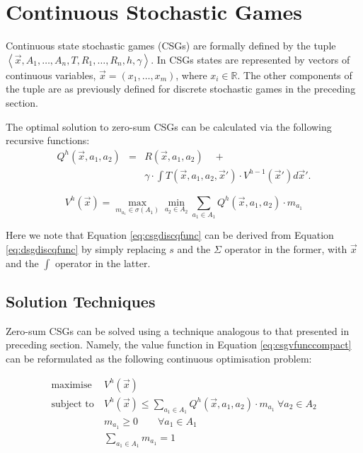 \section{Continuous Stochastic Games}
\label{sec:csg}

Continuous state stochastic games (CSGs) are formally defined by the tuple
$ \left\langle \vec{x}, A_{1}, \ldots, A_{n}, T, R_{1}, \ldots, R_{n}, h, \gamma  \right\rangle$.
In CSGs states are represented by vectors of continuous variables, $\vec{x} = \left(x_1, \ldots, x_m \right)$, 
where $x_i \in \mathbb{R}$. The other components of the tuple are as 
previously defined for discrete stochastic games in the preceding section.

The optimal solution to zero-sum CSGs can be calculated via the 
following recursive functions:
{\small 
\begin{eqnarray}
\label{eq:csgdiscqfunc}
  Q^{h}(\vec{x}, a_1, a_2) &=& R(\vec{x}, a_1, a_2) \quad + \nonumber \\
  && \gamma \cdot \int T(\vec{x}, a_1, a_2, \vec{x}') \cdot V^{h-1}(\vec{x}') d\vec{x}' .
\end{eqnarray}
}%

{\small 
\begin{equation}
\label{eq:csgvfunccompact}
  V^{h}(\vec{x}) = \max_{m_{a_{1}} \in \sigma(A_1)} \min_{a_2 \in A_2} \sum_{a_1 \in A_1} Q^{h}(\vec{x}, a_1, a_2) \cdot m_{a_{1}}
\end{equation}
}%

Here we note that Equation \eqref{eq:csgdiscqfunc} can be derived from Equation \eqref{eq:dsgdiscqfunc}
by simply replacing $s$ and the $\Sigma$ operator in the former, with $\vec{x}$
and the $\int$ operator in the latter.

\subsection{Solution Techniques}

Zero-sum CSGs can be solved using a technique analogous to that 
presented in preceding section. Namely, the value function in Equation
\eqref{eq:csgvfunccompact} can be reformulated as the following continuous 
optimisation problem:

{\small 
\begin{subequations}
\begin{align}
\text{maximise} &\   V^{h}(\vec{x}) \nonumber \\
\text{subject to} &\   V^{h}(\vec{x}) \leq \sum_{a_1 \in A_1} Q^{h}(\vec{x}, a_1, a_2) \cdot m_{a_{1}} \   \forall a_2 \in A_2 \label{eq:bilinearconstraint} \\
                          &\   m_{a_{1}} \geq 0 \qquad \forall a_{1} \in A_1 \nonumber\\
                          &\   \sum_{a_{1} \in A_1} m_{a_{1}} = 1 \nonumber        
\end{align}
\end{subequations}
}%

